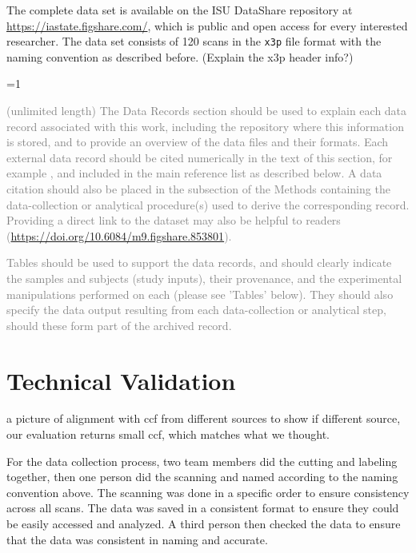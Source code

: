 \documentclass[fleqn,10pt]{wlscirep}
\newcommand{\tom}[1]{{\textcolor{RedOrange}{#1}}}
\newcommand{\ifinstruction}{0} %
\begin{document}
The complete data set is available on the ISU DataShare repository at
\href{https://iastate.figshare.com/}{https://iastate.figshare.com/},
which is public and open access for every interested researcher. The
data set consists of 120 scans in the \texttt{x3p} file format with the
naming convention as described before.
\tom{(Explain the x3p header info?)}

\ifnum \ifinstruction=1

\textcolor{gray}{(unlimited length) The Data Records section should be used to explain each data record associated with this work, including the repository where this information is stored, and to provide an overview of the data files and their formats. Each external data record should be cited numerically in the text of this section, for example \cite{Hao:gidmaps:2014}, and included in the main reference list as described below. A data citation should also be placed in the subsection of the Methods containing the data-collection or analytical procedure(s) used to derive the corresponding record. Providing a direct link to the dataset may also be helpful to readers (\hyperlink{https://doi.org/10.6084/m9.figshare.853801}{https://doi.org/10.6084/m9.figshare.853801}).}

\textcolor{gray}{Tables should be used to support the data records, and should clearly indicate the samples and subjects (study inputs), their provenance, and the experimental manipulations performed on each (please see 'Tables' below). They should also specify the data output resulting from each data-collection or analytical step, should these form part of the archived record.}
\fi

\section*{Technical Validation}\label{sec-technical-validation}

\tom{a picture of alignment with ccf from different sources to show if different source, our evaluation returns small ccf, which matches what we thought.}

For the data collection process, two team members did the cutting and
labeling together, then one person did the scanning and named according
to the naming convention above. The scanning was done in a specific
order to ensure consistency across all scans. The data was saved in a
consistent format to ensure they could be easily accessed and analyzed.
A third person then checked the data to ensure that the data was
consistent in naming and accurate.
\end{document}
